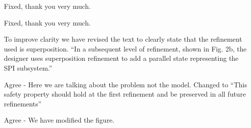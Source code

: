 \documentclass{response}
\begin{document}
\begin{comment}{Reviewer \#3}
  * Line -9: "on an Idle state" -> "in an Idle state".
\end{comment}

\begin{response}
  Fixed, thank you very much.
\end{response}

\begin{comment}{Reviewer \#3}
* Line -6: "while SPI subsystem ..." -> "while the SPI subsystem ..."
\end{comment}

\begin{response}
  Fixed, thank you very much.
\end{response}

\begin{comment}{Reviewer \#3}
  Page 6:

  * Figure 2: this looks like a way of modeling event refinement,
  which seems different from state refinement. Perhaps comment on
  this.
\end{comment}

\begin{response}
  To improve clarity we have revised the text to clearly state that 
  the refinement used is superposition. ``In a subsequent level of refinement, shown in Fig. 2b, the designer uses superposition refinement to add a parallel state representing the SPI subsystem.''
\end{response}

\begin{comment}{Reviewer \#3}
  * Line -7: "This safety property is introduced ..." : where, when?
\end{comment}

\begin{response}
	Agree - Here we are talking about the problem not the model. Changed to ``This safety property should hold at the first refinement and be preserved in all future refinements''
\end{response}

\begin{comment}{Reviewer \#3}
* Figure 2(b): "last_byte_send" -> "last_byte_sent".
\end{comment}

\begin{response}
  Agree - We have modified the figure.
\end{response}

\begin{comment}{Reviewer \#3}
  Page 7:

  * Mid: "Ancillary data, with corresponding actions to alter it, can
  ..." - something is wrong with this sentence.
\end{comment}
\end{document}
